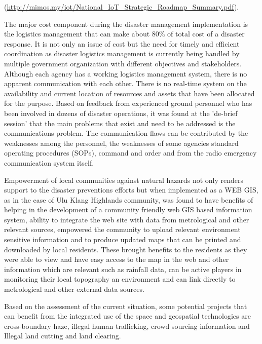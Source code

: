 {{(\url{http://mimos.my/iot/National_IoT_Strategic_Roadmap_Summary.pdf}). 
	
\vspace{0.4 cm}
  
The major cost component during the disaster management implementation is the logistics management that can make about 80\% of total cost of a disaster response. It is not only an  issue of cost but the need for timely and efficient coordination as disaster logistics management is currently being handled by multiple government organization with different objectives and stakeholders. Although each agency has a working logistics management system, there is no apparent communication with each other. There is no real-time system on the availability and current location of resources and assets that have been allocated for the purpose. Based on feedback from experienced ground personnel who has been involved in dozens of disaster operations, it was found at the 'de-brief session' that the main problems that exist and need to be addressed is the communications problem. The communication flaws can be contributed by the weaknesses among the personnel, the weaknesses of some agencies standard operating procedures (SOPs), command and order and from the radio emergency communication system itself.
	
\vspace{0.4 cm}
  
	Empowerment of local communities against natural hazards not only renders support to the disaster preventions efforts but when implemented as a WEB GIS, as in the case of Ulu Klang Highlands community, was found to have benefits of helping in the development of a community friendly web GIS based information system, ability to integrate the web site with data from metrological and other relevant sources, empowered the community to upload relevant environment sensitive information and to produce updated maps that can be printed and downloaded by local residents. These brought benefits to the residents as they were able to view and have easy access to the map in the web and other information which are relevant such as rainfall data, can be active players in monitoring their local topography an environment and can link directly to metrological and other external data sources.
		
\vspace{0.4 cm}
  
	Based on the assessment of the current situation, some potential projects that can benefit from the integrated use of the space and geospatial technologies are cross-boundary haze, illegal human trafficking, crowd sourcing information and Illegal land cutting and land clearing.
		
}}
